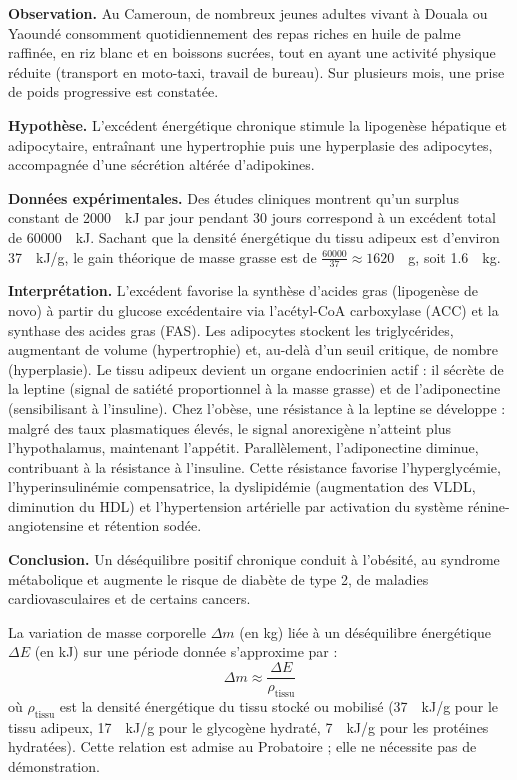 \documentclass[11pt]{article}
\newcommand{\cle}[1]{{\popxbold\color{popdark}#1}}
\begin{document}
\textbf{Observation.} Au Cameroun, de nombreux jeunes adultes vivant à Douala ou Yaoundé consomment quotidiennement des repas riches en huile de palme raffinée, en riz blanc et en boissons sucrées, tout en ayant une activité physique réduite (transport en moto-taxi, travail de bureau). Sur plusieurs mois, une prise de poids progressive est constatée.

\textbf{Hypothèse.} L'excédent énergétique chronique stimule la \cle{lipogenèse} hépatique et adipocytaire, entraînant une hypertrophie puis une hyperplasie des adipocytes, accompagnée d'une sécrétion altérée d'adipokines.

\textbf{Données expérimentales.} Des études cliniques montrent qu'un surplus constant de \num{2000}~\SI{}{kJ} par jour pendant 30 jours correspond à un excédent total de \num{60000}~\SI{}{kJ}. Sachant que la densité énergétique du tissu adipeux est d'environ \num{37}~\SI{}{kJ/g}, le gain théorique de masse grasse est de $\frac{60000}{37} \approx 1620$~\SI{}{g}, soit \num{1,6}~\SI{}{kg}.

\textbf{Interprétation.} L'excédent favorise la synthèse d'acides gras (lipogenèse de novo) à partir du glucose excédentaire via l'acétyl-CoA carboxylase (ACC) et la synthase des acides gras (FAS). Les adipocytes stockent les triglycérides, augmentant de volume (hypertrophie) et, au-delà d'un seuil critique, de nombre (hyperplasie). Le tissu adipeux devient un organe endocrinien actif : il sécrète de la \cle{leptine} (signal de satiété proportionnel à la masse grasse) et de l'\cle{adiponectine} (sensibilisant à l'insuline). Chez l'obèse, une \cle{résistance à la leptine} se développe : malgré des taux plasmatiques élevés, le signal anorexigène n'atteint plus l'hypothalamus, maintenant l'appétit. Parallèlement, l'adiponectine diminue, contribuant à la \cle{résistance à l'insuline}. Cette résistance favorise l'hyperglycémie, l'hyperinsulinémie compensatrice, la dyslipidémie (augmentation des VLDL, diminution du HDL) et l'hypertension artérielle par activation du système rénine-angiotensine et rétention sodée.

\textbf{Conclusion.} Un déséquilibre positif chronique conduit à l'obésité, au syndrome métabolique et augmente le risque de diabète de type 2, de maladies cardiovasculaires et de certains cancers.

\begin{propriete}
La variation de masse corporelle $\Delta m$ (en kg) liée à un déséquilibre énergétique $\Delta E$ (en kJ) sur une période donnée s'approxime par :
\[
\Delta m \approx \frac{\Delta E}{\rho_{\text{tissu}}}
\]
où $\rho_{\text{tissu}}$ est la densité énergétique du tissu stocké ou mobilisé (\num{37}~\SI{}{kJ/g} pour le tissu adipeux, \num{17}~\SI{}{kJ/g} pour le glycogène hydraté, \num{7}~\SI{}{kJ/g} pour les protéines hydratées). Cette relation est admise au Probatoire ; elle ne nécessite pas de démonstration.
\end{propriete}
\end{document}
